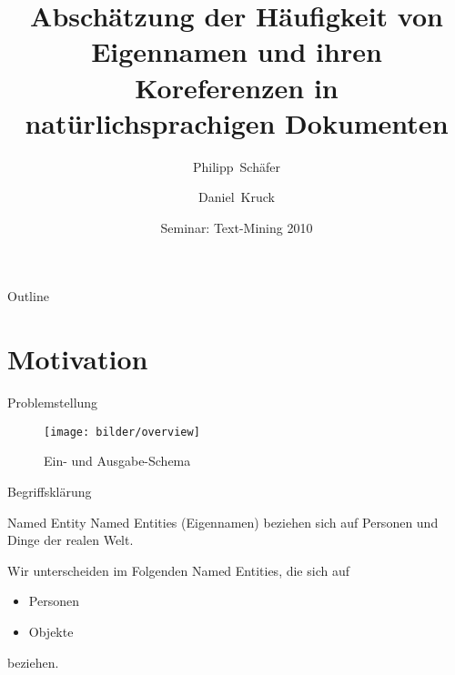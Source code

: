\documentclass{beamer}
\title[Named Entity Recognition] %
{Abschätzung der Häufigkeit von Eigennamen und ihren Koreferenzen in natürlichsprachigen Dokumenten}
\author[Schäfer, Kruck] %
{Philipp~Schäfer \and Daniel~Kruck}
\institute[University of Heidelberg] %
\date[TM 2010] %
{Seminar: Text-Mining 2010}
\begin{document}
\begin{frame}
  \titlepage
\end{frame}

\begin{frame}{Outline}
  \tableofcontents
\end{frame}






\section{Motivation}
\begin{frame}{Problemstellung}
	\begin{figure}
		\texttt{[image: bilder/overview]}
		\caption{Ein- und Ausgabe-Schema}
		\label{pic:input-output}
	\end{figure}

\end{frame}
%
%


\begin{frame}{Begriffsklärung}
\begin{block}{Named Entity}
         Named Entities (Eigennamen) beziehen sich auf Personen und Dinge der realen Welt.
\end{block}
Wir unterscheiden im Folgenden Named Entities, die sich auf

\begin{itemize}
	\item{Personen}
	\item{Objekte}
\end{itemize}
beziehen.
\end{frame}
\end{document}
